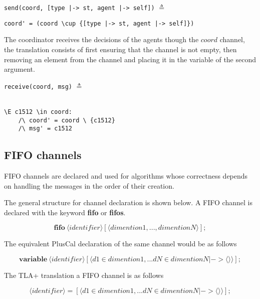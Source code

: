 \documentclass{thesul}
\newcommand{\seq}[1]{\langle #1 \rangle}
\newcommand{\keyword}[1]{\textbf{#1}}
\newcommand{\entity}[1]{\ensuremath{\langle}#1\ensuremath{\rangle}}
\begin{document}
\begin{minipage}{.46\textwidth}

\lstinline!send(coord, [type |-> st, agent |-> self])! $\triangleq$
\end{minipage}
\begin{minipage}{.9\textwidth}
\lstinline!coord' = (coord \cup {[type |-> st, agent |-> self]})!
\end{minipage}\hfill\hfill

The coordinator receives the decisions of the agents though the $coord$ channel, the translation consists of first ensuring that the channel is not empty, then removing an element from the channel and placing it in the variable of the second argument. 

\begin{minipage}{.25\textwidth}

\lstinline!receive(coord, msg)! $\triangleq$\\\\
\end{minipage}
\begin{minipage}{.9\textwidth}
\begin{lstlisting}[frame = none, numbers = none]
\E c1512 \in coord:
	/\ coord' = coord \ {c1512}
	/\ msg' = c1512
\end{lstlisting}

\end{minipage}\hfill


\subsection{FIFO channels}

FIFO channels are declared and used for algorithms whose correctness depends on handling the messages in the order of their creation.

The general structure for channel declaration is shown below. A FIFO channel is declared with the keyword \keyword{fifo} or \keyword{fifos}. 

\[
 \keyword{fifo}\ \entity{identifier}[\entity{dimention1,...,dimentionN}];
\]

The equivalent PlusCal declaration of the same channel would be as follows

\[
 \keyword{variable}\ \entity{identifier}[\entity{d1 \in dimention1,... dN \in dimentionN |-> \seq{}}];
\]

The TLA+ translation a FIFO channel is as follows

\[
 \entity{identifier} = [\entity{d1 \in dimention1,... dN \in dimentionN |-> \seq{}}];
\]
\end{document}
